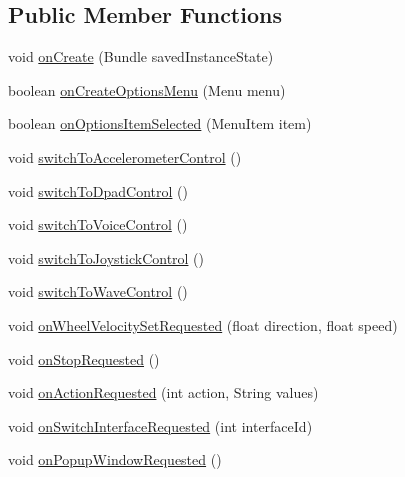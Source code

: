\subsection*{Public Member Functions}
\begin{DoxyCompactItemize}
\item 
void \hyperlink{classcom_1_1cellbots_1_1directcontrol_1_1_cellbot_direct_control_activity_a54d883d59f868bb8f2d1761656e84f5b}{on\-Create} (Bundle saved\-Instance\-State)
\item 
boolean \hyperlink{classcom_1_1cellbots_1_1directcontrol_1_1_cellbot_direct_control_activity_af181663750d0bb7101112d150c5c7ff5}{on\-Create\-Options\-Menu} (Menu menu)
\item 
boolean \hyperlink{classcom_1_1cellbots_1_1directcontrol_1_1_cellbot_direct_control_activity_ab2ca285de1252f28f807a3f246519c40}{on\-Options\-Item\-Selected} (Menu\-Item item)
\item 
void \hyperlink{classcom_1_1cellbots_1_1directcontrol_1_1_cellbot_direct_control_activity_ac52d768186b84bf737fbc03c36d28aee}{switch\-To\-Accelerometer\-Control} ()
\item 
void \hyperlink{classcom_1_1cellbots_1_1directcontrol_1_1_cellbot_direct_control_activity_a998a0e1f6d55a6555182ccbb8b0e6812}{switch\-To\-Dpad\-Control} ()
\item 
void \hyperlink{classcom_1_1cellbots_1_1directcontrol_1_1_cellbot_direct_control_activity_a33640d23fcb852144f29d8e6bd58397c}{switch\-To\-Voice\-Control} ()
\item 
void \hyperlink{classcom_1_1cellbots_1_1directcontrol_1_1_cellbot_direct_control_activity_a6cc70eded3c44e03a216dbb378436c51}{switch\-To\-Joystick\-Control} ()
\item 
void \hyperlink{classcom_1_1cellbots_1_1directcontrol_1_1_cellbot_direct_control_activity_a00072449e69c2d28c3fb1b94e03e1c27}{switch\-To\-Wave\-Control} ()
\item 
void \hyperlink{classcom_1_1cellbots_1_1directcontrol_1_1_cellbot_direct_control_activity_a390529ec9dcbb430d59ba7b70cdb75d8}{on\-Wheel\-Velocity\-Set\-Requested} (float direction, float speed)
\item 
void \hyperlink{classcom_1_1cellbots_1_1directcontrol_1_1_cellbot_direct_control_activity_a6b42066c232fca0e84c81834d0fb5c52}{on\-Stop\-Requested} ()
\item 
void \hyperlink{classcom_1_1cellbots_1_1directcontrol_1_1_cellbot_direct_control_activity_a86acd3ec7fe9f98c94ab4ffca12ff189}{on\-Action\-Requested} (int action, String values)
\item 
void \hyperlink{classcom_1_1cellbots_1_1directcontrol_1_1_cellbot_direct_control_activity_aed85456d7d3078f6087701f395a4dc4d}{on\-Switch\-Interface\-Requested} (int interface\-Id)
\item 
void \hyperlink{classcom_1_1cellbots_1_1directcontrol_1_1_cellbot_direct_control_activity_a10fa73edbb86fc65ed2e6362ac35845d}{on\-Popup\-Window\-Requested} ()
\end{DoxyCompactItemize}
